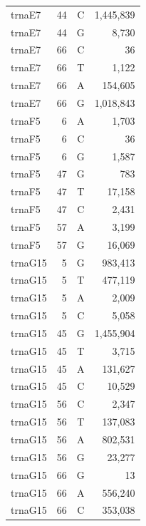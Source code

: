 \documentclass[12pt]{rockefeller}
\begin{document}
\begin{tiny}
\begin{longtable}{|l|r|c|r|}
  trnaE7 &        44 &          C &  1,445,839 \\
  trnaE7 &        44 &          G &      8,730 \\
  trnaE7 &        66 &          C &         36 \\
  trnaE7 &        66 &          T &      1,122 \\
  trnaE7 &        66 &          A &    154,605 \\
  trnaE7 &        66 &          G &  1,018,843 \\
  trnaF5 &         6 &          A &      1,703 \\
  trnaF5 &         6 &          C &         36 \\
  trnaF5 &         6 &          G &      1,587 \\
  trnaF5 &        47 &          G &        783 \\
  trnaF5 &        47 &          T &     17,158 \\
  trnaF5 &        47 &          C &      2,431 \\
  trnaF5 &        57 &          A &      3,199 \\
  trnaF5 &        57 &          G &     16,069 \\
 trnaG15 &         5 &          G &    983,413 \\
 trnaG15 &         5 &          T &    477,119 \\
 trnaG15 &         5 &          A &      2,009 \\
 trnaG15 &         5 &          C &      5,058 \\
 trnaG15 &        45 &          G &  1,455,904 \\
 trnaG15 &        45 &          T &      3,715 \\
 trnaG15 &        45 &          A &    131,627 \\
 trnaG15 &        45 &          C &     10,529 \\
 trnaG15 &        56 &          C &      2,347 \\
 trnaG15 &        56 &          T &    137,083 \\
 trnaG15 &        56 &          A &    802,531 \\
 trnaG15 &        56 &          G &     23,277 \\
 trnaG15 &        66 &          G &         13 \\
 trnaG15 &        66 &          A &    556,240 \\
 trnaG15 &        66 &          C &    353,038 \\

\end{longtable}
\end{tiny}
\end{document}
